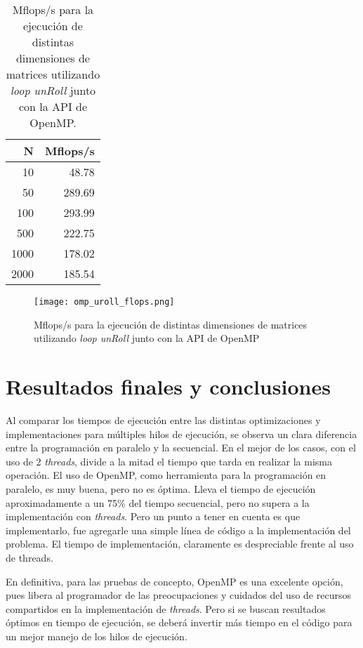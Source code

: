 \documentclass[a4paper,11pt]{article}
\begin{document}
\begin{table}
\begin{center}
\begin{tabular}{|r|r|}
\hline
         N & Mflops/s \\
\hline
        10 &   48.78 \\
\hline
        50 &   289.69 \\
\hline
       100 &   293.99 \\
\hline
       500 &   222.75 \\
\hline
      1000 &   178.02 \\
\hline
      2000 &   185.54 \\
\hline
\end{tabular}
\caption{Mflops/s para la ejecuci\'on de distintas dimensiones de matrices utilizando \emph{loop unRoll} junto con la API de OpenMP.}\label{tabla6}
\end{center}
\end{table}

\begin{figure}
\centering
\texttt{[image: omp\_uroll\_flops.png]}
\caption{Mflops/s para la ejecuci\'on de distintas dimensiones de matrices utilizando \emph{loop unRoll} junto con la API de OpenMP}\label{figura6}
\end{figure}

\section{Resultados finales y conclusiones}

Al comparar los tiempos de ejecuci\'on entre las distintas optimizaciones y implementaciones para m\'ultiples hilos de ejecuci\'on, se observa un clara diferencia entre la programaci\'on en paralelo y la secuencial. En el mejor de los casos, con el uso de 2 \emph{threads}, divide a la mitad el tiempo que tarda en realizar la misma operaci\'on.
El uso de OpenMP, como herramienta para la programaci\'on en paralelo, es muy buena, pero no es \'optima. Lleva el tiempo de ejecuci\'on aproximadamente a un 75\% del tiempo secuencial, pero no supera a la implementaci\'on con \emph{threads}.
Pero un punto a tener en cuenta es que implementarlo, fue agregarle una simple l\'inea de c\'odigo a la implementaci\'on del problema. El tiempo de implementaci\'on, claramente es despreciable frente al uso de threads.

En definitiva, para las pruebas de concepto, OpenMP es una excelente opci\'on, pues libera al programador de las preocupaciones y cuidados del uso de recursos compartidos en la implementaci\'on de \emph{threads}. Pero si se buscan resultados \'optimos en tiempo de ejecuci\'on, se deber\'a invertir m\'as tiempo en el c\'odigo para un mejor manejo de los hilos de ejecuci\'on.
\end{document}
